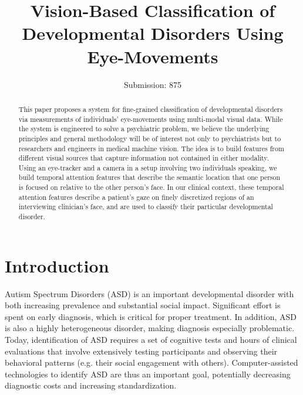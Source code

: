 \documentclass{llncs}
\begin{document}
  \title{Vision-Based Classification of Developmental Disorders Using Eye-Movements}
  \author{Submission: 875}
  \institute{}


  \maketitle

  \begin{abstract}
    This paper proposes a system for fine-grained classification of developmental disorders via measurements of individuals' eye-movements using multi-modal visual data. While the system is engineered to solve a psychiatric problem, we believe the underlying principles and general methodology will be of interest not only to psychiatrists but to researchers and engineers in medical machine vision. The idea is to build features from different visual sources that capture information not contained in either modality. Using an eye-tracker and a camera in a setup involving two individuals speaking, we build temporal attention features that describe the semantic location that one person is focused on relative to the other person's face. In our clinical context, these temporal attention features describe a patient's gaze on finely discretized regions of an interviewing clinician's face, and are used to classify their particular developmental disorder. 
  \end{abstract}
  
  \vspace{-2.5em}
  \section{Introduction}
  \vspace{-1em}
  Autism Spectrum Disorders (ASD) is an important developmental disorder with both increasing prevalence and substantial social impact. Significant effort is spent on early diagnosis, which is critical for proper treatment. In addition, ASD is also a highly heterogeneous disorder, making diagnosis especially problematic. Today, identification of ASD requires a set of cognitive tests and hours of clinical evaluations that involve extensively testing participants and observing their behavioral patterns (e.g. their social engagement with others). Computer-assisted technologies to identify ASD are thus an important goal, potentially decreasing diagnostic costs and increasing standardization.
\end{document}
